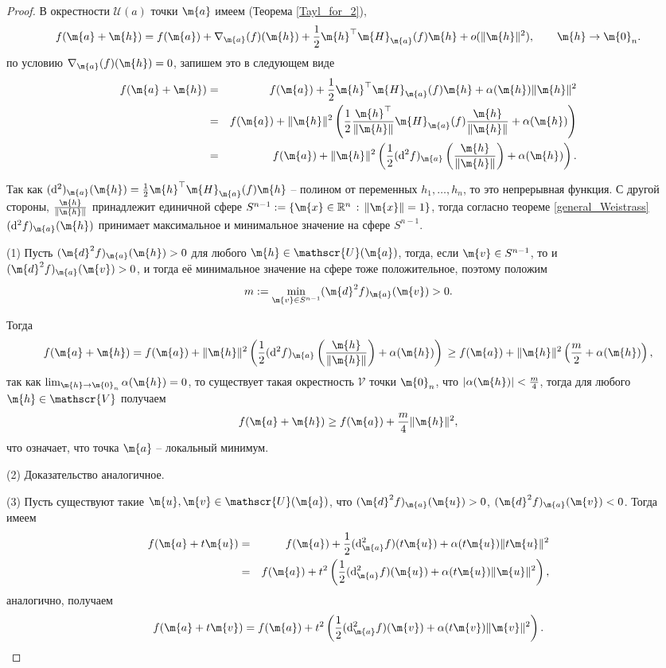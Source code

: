 \begin{proof}
    В окрестности $\mathscr{U}(a)$ точки $\m{a}$ имеем (Теорема \ref{Tayl_for_2}),
     \[
     f(\m{a} + \m{h}) =f(\m{a}) + \nabla_\m{a}(f)(\m{h}) + \frac{1}{2} \m{h}^\top \m{H}_\m{a}(f) \m{h} + o(\|\m{h}\|^2), \qquad \m{h} \to \m{0}_n.
    \]
    по условию $\nabla_\m{a}(f)(\m{h}) = 0$, запишем это в следующем виде
\begin{eqnarray*}
    f(\m{a} + \m{h}) &=& f(\m{a}) +  \frac{1}{2} \m{h}^\top \m{H}_\m{a}(f) \m{h} + \alpha(\m{h}) \| \m{h}\|^2 \\
   &=& f(\m{a}) + \|\m{h}\|^2 \left( \frac{1}{2}\frac{\m{h}^\top}{\|\m{h} \|} \m{H}_\m{a}(f) \frac{\m{h}}{\|\m{h} \|} + \alpha(\m{h}) \right) \\
   &=&f(\m{a}) + \|\m{h}\|^2\left( \frac{1}{2} (\mathrm{d}^2f)_\m{a}\left(\frac{\m{h}} {\|\m{h}\|}\right) + \alpha(\m{h}) \right).
\end{eqnarray*}

Так как $(\mathrm{d}^2)_\m{a}(\m{h}) = \frac{1}{2} \m{h}^\top \m{H}_\m{a}(f) \m{h}$ -- полином от переменных $h_1, \ldots, h_n$, то это непрерывная функция. С другой стороны, $\frac{\m{h}}{\| \m{h}\|}$ принадлежит единичной сфере $S^{n-1}: = \{\m{x} \in \mathbb{R}^n\, :\, \|\m{x}\| = 1\}$, тогда согласно теореме \ref{general_Weistrass} $(\mathrm{d}^2f)_\m{a}(\m{h})$ принимает максимальное и минимальное значение на сфере $S^{n-1}.$

(1) Пусть $(\m{d}^2f)_\m{a}(\m{h}) >0 $ для любого $\m{h} \in \mathscr{U}(\m{a})$, тогда, если $\m{v} \in S^{n-1}$, то и $(\m{d}^2f)_\m{a}(\m{v}) >0 $, и тогда её минимальное значение на сфере тоже положительное, поэтому положим
\[
 m: = \min_{\m{v} \in S^{n-1}} (\m{d}^2f)_\m{a}(\m{v}) > 0.
\]

Тогда
\[
 f(\m{a} + \m{h}) = f(\m{a}) + \| \m{h}\|^2 \left( \frac{1}{2} (\mathrm{d}^2f)_\m{a}\left(\frac{\m{h}} {\|\m{h}\|}\right) + \alpha(\m{h}) \right) \\
 \ge  f(\m{a}) + \| \m{h}\|^2 \left( \frac{m}{2} +\alpha(\m{h})\right),
\]
так как $\lim_{\m{h} \to \m{0}_n} \alpha(\m{h}) = 0 $, то существует такая окрестность $\mathscr{V}$ точки $\m{0}_n$, что $|\alpha(\m{h})|< \frac{m}{4}$, тогда для любого $\m{h} \in \mathscr{V}$ получаем
\[
  f(\m{a} + \m{h}) \ge f(\m{a}) + \frac{m}{4} \| \m{h}\|^2,
\]
что означает, что точка $\m{a}$ -- локальный минимум.

(2) Доказательство аналогичное.

(3) Пусть существуют такие $\m{u}, \m{v} \in \mathscr{U}(\m{a})$, что $(\m{d}^2f)_\m{a}(\m{u}) >0$, $(\m{d}^2f)_\m{a}(\m{v}) <0$. Тогда имеем
 \begin{eqnarray*}
     f(\m{a} + t \m{u}) &=& f(\m{a}) + \frac{1}{2} (\mathrm{d}^2_\m{a}f)(t\m{u}) + \alpha(t \m{u})\| t \m{u}\|^2 \\
     &=& f(\m{a}) + t^2 \left( \frac{1}{2} (\mathrm{d}^2_\m{a}f)(\m{u}) + \alpha(t \m{u})\| \m{u}\|^2 \right),
 \end{eqnarray*}
 аналогично, получаем
 \[
     f(\m{a} + t \m{v}) = f(\m{a}) + t^2 \left( \frac{1}{2} (\mathrm{d}^2_\m{a}f)(\m{v}) + \alpha(t \m{v})\| \m{v}\|^2 \right).
 \]


\end{proof}
